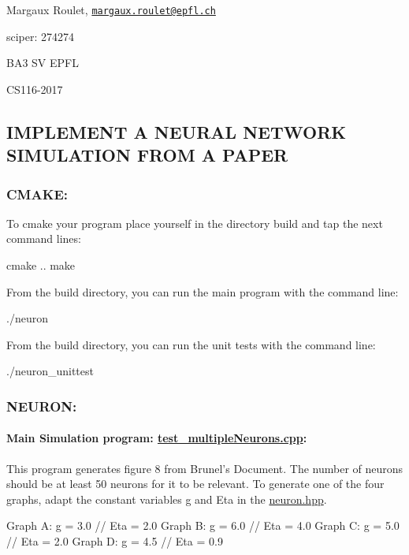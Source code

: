 Margaux Roulet, \href{mailto:margaux.roulet@epfl.ch}{\tt margaux.\-roulet@epfl.\-ch}

sciper\-: 274274

B\-A3 S\-V E\-P\-F\-L

C\-S116-\/2017

\subsection*{I\-M\-P\-L\-E\-M\-E\-N\-T A N\-E\-U\-R\-A\-L N\-E\-T\-W\-O\-R\-K S\-I\-M\-U\-L\-A\-T\-I\-O\-N F\-R\-O\-M A P\-A\-P\-E\-R}

\subsubsection*{C\-M\-A\-K\-E\-:}

To cmake your program place yourself in the directory build and tap the next command lines\-: \begin{DoxyVerb}    cmake ..
    make
\end{DoxyVerb}


From the build directory, you can run the main program with the command line\-: \begin{DoxyVerb}    ./neuron
\end{DoxyVerb}


From the build directory, you can run the unit tests with the command line\-: \begin{DoxyVerb}    ./neuron_unittest
\end{DoxyVerb}


\subsubsection*{N\-E\-U\-R\-O\-N\-:}

\paragraph*{Main Simulation program\-: \hyperlink{test__multipleNeurons_8cpp}{test\-\_\-multiple\-Neurons.\-cpp}\-:}

This program generates figure 8 from Brunel's Document. The number of neurons should be at least 50 neurons for it to be relevant. To generate one of the four graphs, adapt the constant variables g and Eta in the \hyperlink{neuron_8hpp}{neuron.\-hpp}. \begin{DoxyVerb}    Graph A: g = 3.0 // Eta = 2.0 
    Graph B: g = 6.0 // Eta = 4.0 
    Graph C: g = 5.0 // Eta = 2.0
    Graph D: g = 4.5 // Eta = 0.9   
\end{DoxyVerb}


